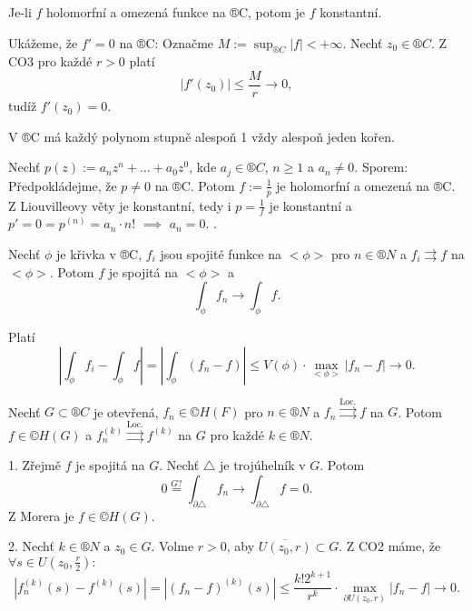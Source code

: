 \documentclass[12pt]{article}					%
\begin{document}
\begin{veta}[Liouville]
	Je-li $f$ holomorfní a omezená funkce na ®C, potom je $f$ konstantní.

	\begin{dukazin}
		Ukážeme, že $f' = 0$ na ®C: Označme $M := \sup_{®C} |f| < +∞$. Nechť $z_0 \in ®C$. Z CO3 pro každé $r > 0$ platí
		$$ |f'(z_0)| ≤ \frac{M}{r} \rightarrow 0, $$
		tudíž $f'(z_0) = 0$.
	\end{dukazin}
\end{veta}

\begin{dusledek}
	V ®C má každý polynom stupně alespoň 1 vždy alespoň jeden kořen.

	\begin{dukazin}
		Nechť $p(z) := a_n z^n + … + a_0 z^0$, kde $a_j \in ®C$, $n ≥ 1$ a $a_n ≠ 0$. Sporem: Předpokládejme, že $p ≠ 0$ na ®C. Potom $f:=\frac{1}{p}$ je holomorfní a omezená na ®C. Z Liouvilleovy věty je konstantní, tedy i $p = \frac{1}{f}$ je konstantní a $p' = 0 = p^{(n)} = a_n · n!$ $\implies$ $a_n = 0$. \lightning.
	\end{dukazin}
\end{dusledek}

\begin{lemma}
	Nechť $\phi$ je křivka v ®C, $f_i$ jsou spojité funkce na $<\phi>$ pro $n \in ®N$ a $f_i \rightrightarrows f$ na $<\phi>$. Potom $f$ je spojitá na $<\phi>$ a
	$$ \int_\phi f_n \rightarrow \int_\phi f. $$

	\begin{dukazin}
		Platí
		$$ |\int_\phi f_i - \int_\phi f| = |\int_\phi (f_n - f)| ≤ V(\phi)·\max_{<\phi>} |f_n - f| \rightarrow 0. $$
	\end{dukazin}
\end{lemma}

\begin{veta}[Weierstrass]
	Nechť $G \subset ®C$ je otevřená, $f_n \in ©H(F)$ pro $n \in ®N$ a $f_n \overset{\text{Loc.}}\rightrightarrows f$ na $G$. Potom $f \in ©H(G)$ a $f_n^{(k)} \overset{\text{Loc.}}\rightrightarrows f^{(k)}$ na $G$ pro každé $k \in ®N$.

	\begin{dukazin}
		1. Zřejmě $f$ je spojitá na $G$. Nechť $\triangle$ je trojúhelník v $G$. Potom
		$$ 0 \overset{G ?}= \int_{\partial \triangle} f_n \rightarrow \int_{\partial \triangle} f = 0. $$
		Z Morera je $f \in ©H(G)$.

		2. Nechť $k \in ®N$ a $z_0 \in G$. Volme $r > 0$, aby $\overline{U(z_0, r)} \subset G$. Z CO2 máme, že $\forall s \in U(z_0, \frac{r}{2}):$
		$$ |f_n^{(k)}(s) - f^{(k)}(s)| = |(f_n - f)^{(k)}(s)| ≤ \frac{k! 2^{k+1}}{r^k}·\max_{\partial U(z_0, r)} |f_n - f| \rightarrow 0. $$
	\end{dukazin}
\end{veta}
\end{document}
